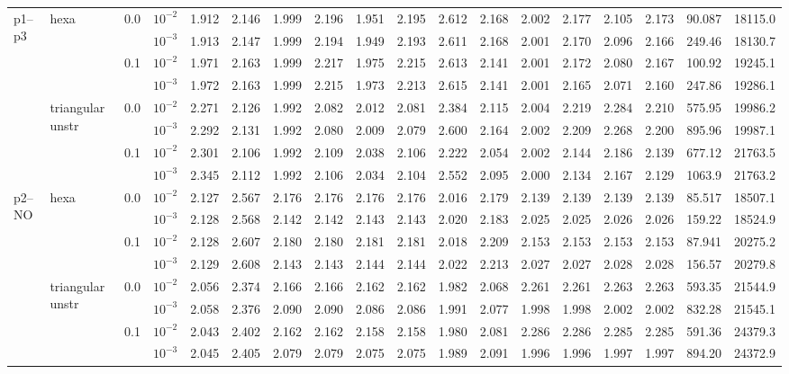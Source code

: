 \begin{longtable}{llclrrrrrrrrrrrrrr}
\multirow{8}{*}{p1--p3} & \multirow{4}{*}{hexa} & \multirow{2}{*}{0.0} & $10^{-2}$ & 1.912 & 2.146 & 1.999 & 2.196 & 1.951 & 2.195 & 2.612 & 2.168 & 2.002 & 2.177 & 2.105 & 2.173 & 90.087 & 18115.0 \\
& & & $10^{-3}$ & 1.913 & 2.147 & 1.999 & 2.194 & 1.949 & 2.193 & 2.611 & 2.168 & 2.001 & 2.170 & 2.096 & 2.166 & 249.46 & 18130.7 \\\cline{3-18}
& & \multirow{2}{*}{0.1} & $10^{-2}$ & 1.971 & 2.163 & 1.999 & 2.217 & 1.975 & 2.215 & 2.613 & 2.141 & 2.001 & 2.172 & 2.080 & 2.167 & 100.92 & 19245.1 \\
& & & $10^{-3}$ & 1.972 & 2.163 & 1.999 & 2.215 & 1.973 & 2.213 & 2.615 & 2.141 & 2.001 & 2.165 & 2.071 & 2.160 & 247.86 & 19286.1 \\\cline{2-18}
& \multirow{4}{*}{triangular unstr} & \multirow{2}{*}{0.0} & $10^{-2}$ & 2.271 & 2.126 & 1.992 & 2.082 & 2.012 & 2.081 & 2.384 & 2.115 & 2.004 & 2.219 & 2.284 & 2.210 & 575.95 & 19986.2 \\
& & & $10^{-3}$ & 2.292 & 2.131 & 1.992 & 2.080 & 2.009 & 2.079 & 2.600 & 2.164 & 2.002 & 2.209 & 2.268 & 2.200 & 895.96 & 19987.1 \\\cline{3-18}
& & \multirow{2}{*}{0.1} & $10^{-2}$ & 2.301 & 2.106 & 1.992 & 2.109 & 2.038 & 2.106 & 2.222 & 2.054 & 2.002 & 2.144 & 2.186 & 2.139 & 677.12 & 21763.5 \\
& & & $10^{-3}$ & 2.345 & 2.112 & 1.992 & 2.106 & 2.034 & 2.104 & 2.552 & 2.095 & 2.000 & 2.134 & 2.167 & 2.129 & 1063.9 & 21763.2 \\\hline

\multirow{8}{*}{p2--NO} & \multirow{4}{*}{hexa} & \multirow{2}{*}{0.0} & $10^{-2}$ & 2.127 & 2.567 & 2.176 & 2.176 & 2.176 & 2.176 & 2.016 & 2.179 & 2.139 & 2.139 & 2.139 & 2.139 & 85.517 & 18507.1 \\
& & & $10^{-3}$ & 2.128 & 2.568 & 2.142 & 2.142 & 2.143 & 2.143 & 2.020 & 2.183 & 2.025 & 2.025 & 2.026 & 2.026 & 159.22 & 18524.9 \\\cline{3-18}
& & \multirow{2}{*}{0.1} & $10^{-2}$ & 2.128 & 2.607 & 2.180 & 2.180 & 2.181 & 2.181 & 2.018 & 2.209 & 2.153 & 2.153 & 2.153 & 2.153 & 87.941 & 20275.2 \\
& & & $10^{-3}$ & 2.129 & 2.608 & 2.143 & 2.143 & 2.144 & 2.144 & 2.022 & 2.213 & 2.027 & 2.027 & 2.028 & 2.028 & 156.57 & 20279.8 \\\cline{2-18}
& \multirow{4}{*}{triangular unstr} & \multirow{2}{*}{0.0} & $10^{-2}$ & 2.056 & 2.374 & 2.166 & 2.166 & 2.162 & 2.162 & 1.982 & 2.068 & 2.261 & 2.261 & 2.263 & 2.263 & 593.35 & 21544.9 \\
& & & $10^{-3}$ & 2.058 & 2.376 & 2.090 & 2.090 & 2.086 & 2.086 & 1.991 & 2.077 & 1.998 & 1.998 & 2.002 & 2.002 & 832.28 & 21545.1 \\\cline{3-18}
& & \multirow{2}{*}{0.1} & $10^{-2}$ & 2.043 & 2.402 & 2.162 & 2.162 & 2.158 & 2.158 & 1.980 & 2.081 & 2.286 & 2.286 & 2.285 & 2.285 & 591.36 & 24379.3 \\
& & & $10^{-3}$ & 2.045 & 2.405 & 2.079 & 2.079 & 2.075 & 2.075 & 1.989 & 2.091 & 1.996 & 1.996 & 1.997 & 1.997 & 894.20 & 24372.9 \\\hline


\end{longtable}
